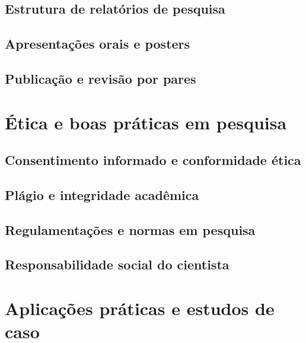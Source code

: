 \documentclass[
]{book}
\begin{document}
\section{Estrutura de relatórios de pesquisa}\label{estrutura-de-relatuxf3rios-de-pesquisa}

\section{Apresentações orais e posters}\label{apresentauxe7uxf5es-orais-e-posters}

\section{Publicação e revisão por pares}\label{publicauxe7uxe3o-e-revisuxe3o-por-pares}

\chapter{Ética e boas práticas em pesquisa}\label{uxe9tica-e-boas-pruxe1ticas-em-pesquisa}

\section{Consentimento informado e conformidade ética}\label{consentimento-informado-e-conformidade-uxe9tica}

\section{Plágio e integridade acadêmica}\label{pluxe1gio-e-integridade-acaduxeamica}

\section{Regulamentações e normas em pesquisa}\label{regulamentauxe7uxf5es-e-normas-em-pesquisa}

\section{Responsabilidade social do cientista}\label{responsabilidade-social-do-cientista}

\chapter{Aplicações práticas e estudos de caso}\label{aplicauxe7uxf5es-pruxe1ticas-e-estudos-de-caso}
\end{document}
